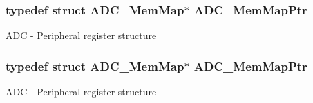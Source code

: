 \subsubsection[{\texorpdfstring{A\+D\+C\+\_\+\+Mem\+Map\+Ptr}{ADC_MemMapPtr}}]{\setlength{\rightskip}{0pt plus 5cm}typedef struct {\bf A\+D\+C\+\_\+\+Mem\+Map}$\ast$ {\bf A\+D\+C\+\_\+\+Mem\+Map\+Ptr}}\hypertarget{group___a_d_c___peripheral_ga1673c677bf7c0ca339c8563e06de75fa}{}\label{group___a_d_c___peripheral_ga1673c677bf7c0ca339c8563e06de75fa}
A\+DC -\/ Peripheral register structure 
\subsubsection[{\texorpdfstring{A\+D\+C\+\_\+\+Mem\+Map\+Ptr}{ADC_MemMapPtr}}]{\setlength{\rightskip}{0pt plus 5cm}typedef struct {\bf A\+D\+C\+\_\+\+Mem\+Map}$\ast$ {\bf A\+D\+C\+\_\+\+Mem\+Map\+Ptr}}\hypertarget{group___a_d_c___peripheral_ga1673c677bf7c0ca339c8563e06de75fa}{}\label{group___a_d_c___peripheral_ga1673c677bf7c0ca339c8563e06de75fa}
A\+DC -\/ Peripheral register structure 